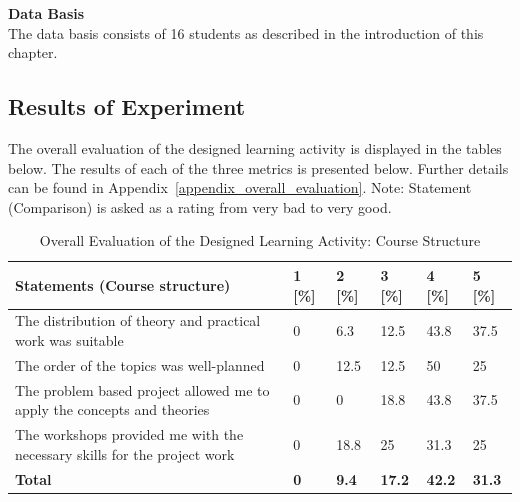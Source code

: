 \noindent\textbf{Data Basis}\\
The data basis consists of 16 students as described in the introduction of this chapter.

\subsection*{Results of Experiment}
The overall evaluation of the designed learning activity is displayed in the tables below. The results of each of the three metrics is presented below. Further details can be found in Appendix~\ref{appendix_overall_evaluation}. Note: Statement (Comparison) is asked as a rating from very bad to very good.

\renewcommand*{\arraystretch}{1.7}
\begin{table}[H]
\centering
\begin{tabular}{|p{9cm}|p{0.8cm}|p{0.8cm}|p{0.8cm}|p{0.8cm}|p{0.8cm}|}
\hline
\rowcolor[HTML]{EFEFEF} 
\textbf{Statements (Course structure)}             & \textbf{1} [\%] & \textbf{2} [\%] & \textbf{3} [\%] & \textbf{4} [\%] & \textbf{5} [\%]   \\ \hline
The distribution of theory and practical work was suitable		& 0 & 6.3 & 12.5 & 43.8 & 37.5    	 	\\ \hline
The order of the topics was well-planned		& 0 & 12.5 & 12.5 & 50 & 25    	 	\\ \hline
The problem based project allowed me to apply the concepts and theories		& 0 & 0 & 18.8 & 43.8 & 37.5    	 	\\ \hline
The workshops provided me with the necessary skills for the project work		& 0 & 18.8 & 25 & 31.3 & 25    	 	\\ \hline
\rowcolor[HTML]{EFEFEF} 
\textbf{Total}             	& \textbf{0}	& \textbf{9.4}	& \textbf{17.2}	 & \textbf{42.2} & \textbf{31.3}   \\ \hline
\end{tabular}
\caption{Overall Evaluation of the Designed Learning Activity: Course Structure}
\label{table:overallevaluationlearningactivitycoursestructure}
\end{table}



